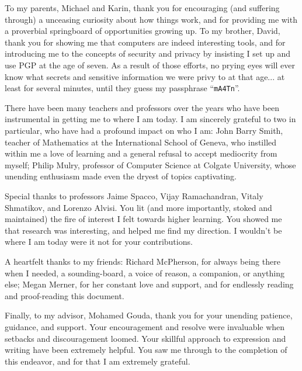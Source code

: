 To my parents, Michael and Karin, thank you for encouraging (and suffering through) a unceasing curiosity about how things work,
    and for providing me with a proverbial springboard of opportunities growing up.
To my brother, David, thank you for showing me that computers are indeed interesting tools,
    and for introducing me to the concepts of security and privacy by insisting I set up and use PGP at the age of seven.
As a result of those efforts, no prying eyes will ever know what secrets and sensitive information we were privy to at that age...
    at least for several minutes, until they guess my passphrase ``\texttt{mA4Tn}''.

There have been many teachers and professors over the years who have been instrumental in getting me to where I am today.
I am sincerely grateful to two in particular, who have had a profound impact on who I am:
    John Barry Smith, teacher of Mathematics at the International School of Geneva,
        who instilled within me a love of learning and a general refusal to accept mediocrity from myself;
    Philip Mulry, professor of Computer Science at Colgate University,
        whose unending enthusiasm made even the dryest of topics captivating.

Special thanks to professors Jaime Spacco, Vijay Ramachandran, Vitaly Shmatikov, and Lorenzo Alvisi.
You lit (and more importantly, stoked and maintained) the fire of interest I felt towards higher learning.
You showed me that research was interesting, and helped me find my direction.
I wouldn't be where I am today were it not for your contributions.

A heartfelt thanks to my friends:
    Richard McPherson, for always being there when I needed, a sounding-board, a voice of reason, a companion, or anything else;
    Megan Merner, for her constant love and support, and for endlessly reading and proof-reading this document.

Finally, to my advisor, Mohamed Gouda, thank you for your unending patience, guidance, and support.
Your encouragement and resolve were invaluable when setbacks and discouragement loomed.
Your skillful approach to expression and writing have been extremely helpful.
You saw me through to the completion of this endeavor, and for that I am extremely grateful.
